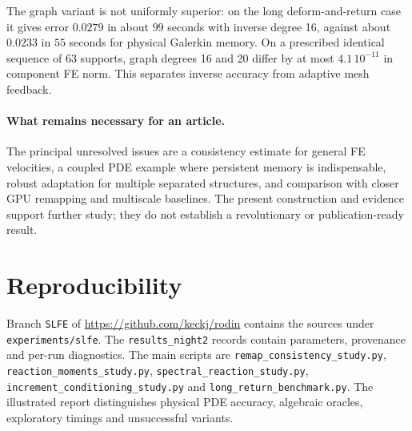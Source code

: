 \documentclass[10pt,a4paper]{article}
\begin{document}
The graph variant is not uniformly superior: on the long deform-and-return
case it gives error $0.0279$ in about $99$ seconds with inverse degree 16,
against about $0.0233$ in $55$ seconds for physical Galerkin memory.
On a prescribed identical sequence of 63 supports, graph degrees 16
and 20 differ by at most $4.1\,10^{-11}$ in component FE norm.
This separates inverse accuracy from adaptive mesh feedback.


\paragraph{What remains necessary for an article.}
The principal unresolved issues are a consistency estimate for general
FE velocities, a coupled PDE example where persistent memory is
indispensable, robust adaptation for multiple separated structures,
and comparison with closer GPU remapping and multiscale baselines.
The present construction and evidence support further study; they do
not establish a revolutionary or publication-ready result.

\section*{Reproducibility}
Branch \texttt{SLFE} of \url{https://github.com/keckj/rodin} contains the
sources under \texttt{experiments/slfe}. The \texttt{results\_night2}
records contain parameters, provenance and per-run diagnostics.
The main scripts are \texttt{remap\_consistency\_study.py},
\texttt{reaction\_moments\_study.py},
\texttt{spectral\_reaction\_study.py},
\texttt{increment\_conditioning\_study.py} and
\texttt{long\_return\_benchmark.py}.
The illustrated report distinguishes physical PDE accuracy, algebraic
oracles, exploratory timings and unsuccessful variants.
\end{document}
